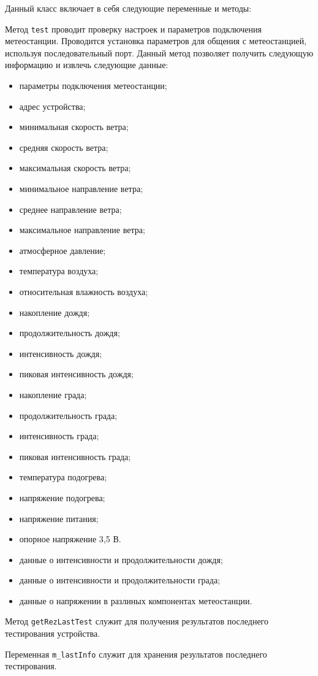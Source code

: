 Данный класс включает в себя следующие переменные и методы:
\begin{enum}
	\item Метод \texttt{test} проводит проверку настроек и параметров подключения метеостанции. Проводится установка
		параметров для общения с метеостанцией, используя последовательный порт. Данный метод позволяет получить
		следующую информацию и извлечь следующие данные:
		\begin{itemize}
			\item параметры подключения метеостанции;
			\item адрес устройства;
			\item минимальная скорость ветра;
			\item средняя скорость ветра;
			\item максимальная скорость ветра;
			\item минимальное направление ветра;
			\item среднее направление ветра;
			\item максимальное направление ветра;
			\item атмосферное давление;
			\item температура воздуха;
			\item относительная влажность воздуха;
			\item накопление дождя;
			\item продолжительность дождя;
			\item интенсивность дождя;
			\item пиковая интенсивность дождя;
			\item накопление града;
			\item продолжительность града;
			\item интенсивность града;
			\item пиковая интенсивность града;
			\item температура подогрева;
			\item напряжение подогрева;
			\item напряжение питания;
			\item опорное напряжение 3,5 В.
			\item данные о интенсивности и продолжительности дождя;
			\item данные о интенсивности и продолжительности града;
			\item данные о напряжении в разлиных компонентах метеостанции.
		\end{itemize}
	\item Метод \texttt{getRezLastTest} служит для получения результатов последнего тестирования устройства.
	\item Переменная \texttt{m\_lastInfo} служит для хранения результатов последнего тестирования.
\end{enum}

